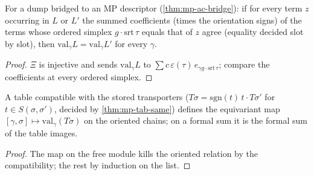 \begin{theorem}\label{thm:mp-tab-same}
  \leanok
  For a dump bridged to an MP descriptor (\ref{thm:mp-ac-bridge}): if for every term $z$ occurring in $L$ or $L'$ the summed
  coefficients (times the orientation signs) of the terms whose ordered simplex $g\cdot\mathrm{srt}\,\tau$ equals that of $z$ agree
  (equality decided slot by slot), then $\mathrm{val}_\gamma L=\mathrm{val}_\gamma L'$ for every $\gamma$.
\end{theorem}
\begin{proof}
  \leanok
  $\Xi$ is injective and sends $\mathrm{val}_\gamma L$ to $\sum c\,\varepsilon(\tau)\,e_{\gamma g\cdot\mathrm{srt}\,\tau}$; compare the
  coefficients at every ordered simplex.
\end{proof}

\begin{definition}\label{def:mp-tab-map}
  \leanok
  A table compatible with the stored transporters ($T\sigma=\mathrm{sgn}(t)\,t\cdot T\sigma'$ for $t\in S(\sigma,\sigma')$, decided by
  \ref{thm:mp-tab-same}) defines the equivariant map $[\gamma,\sigma]\mapsto\mathrm{val}_\gamma(T\sigma)$ on the oriented chains; on a
  formal sum it is the formal sum of the table images.
\end{definition}
\begin{proof}
  \leanok
  The map on the free module kills the oriented relation by the compatibility; the rest by induction on the list.
\end{proof}

